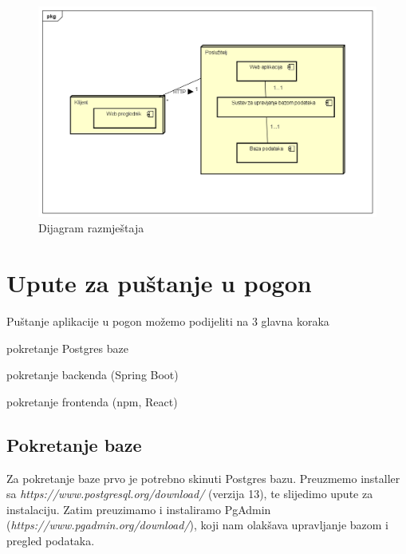 			 \begin{figure}[H]
				\includegraphics[scale=0.6]{dijagrami/deploy.png} 
				\centering
				\caption{Dijagram razmještaja}
				\label{fig:dijagram-razmjestaja}
			\end{figure}
			
			\eject 
		
		\section{Upute za puštanje u pogon}
			
			Puštanje aplikacije u pogon možemo podijeliti na 3 glavna koraka
			         \begin{packed_item}
                            \item[$\bullet$] pokretanje Postgres baze
                            \item[$\bullet$] pokretanje backenda (Spring Boot)
                            \item[$\bullet$] pokretanje frontenda (npm, React)
                    \end{packed_item}
                    
                \subsection{Pokretanje baze}
                
                Za pokretanje baze prvo je potrebno skinuti Postgres bazu. Preuzmemo installer sa \textit{https://www.postgresql.org/download/} (verzija 13), te slijedimo upute za instalaciju. Zatim preuzimamo i instaliramo PgAdmin (\textit{https://www.pgadmin.org/download/}), koji nam olakšava upravljanje bazom i pregled podataka. \newline
                
